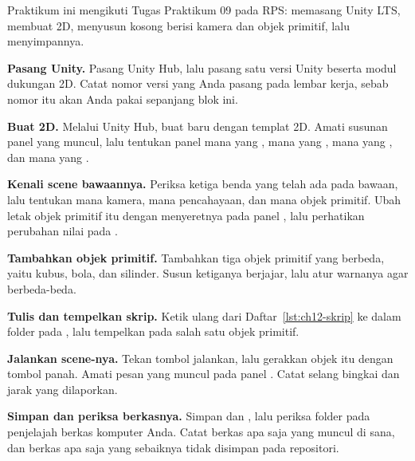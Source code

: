 \begin{praktikumbox}
Praktikum ini mengikuti Tugas Praktikum 09 pada RPS: memasang Unity LTS,
membuat  2D, menyusun  kosong berisi kamera dan
objek primitif, lalu menyimpannya.

\begin{langkah}
  \item \textbf{Pasang Unity.} Pasang Unity Hub, lalu pasang satu versi Unity
         beserta modul dukungan 2D. Catat nomor versi yang Anda
        pasang pada lembar kerja, sebab nomor itu akan Anda pakai sepanjang
        blok ini.

  \item \textbf{Buat  2D.} Melalui Unity Hub, buat
         baru dengan templat 2D. Amati susunan panel yang
        muncul, lalu tentukan panel mana yang , mana yang
        , mana yang , dan mana yang
        .

  \item \textbf{Kenali scene bawaannya.} Periksa ketiga benda yang telah ada
        pada  bawaan, lalu tentukan mana kamera, mana
        pencahayaan, dan mana objek primitif. Ubah letak objek primitif itu
        dengan menyeretnya pada panel , lalu perhatikan perubahan
        nilai pada .

  \item \textbf{Tambahkan objek primitif.} Tambahkan tiga objek primitif yang
        berbeda, yaitu kubus, bola, dan silinder. Susun ketiganya berjajar, lalu
        atur warnanya agar berbeda-beda.

  \item \textbf{Tulis dan tempelkan skrip.} Ketik ulang
         dari Daftar~\ref{lst:ch12-skrip} ke dalam
        folder  pada , lalu tempelkan pada
        salah satu objek primitif.

  \item \textbf{Jalankan scene-nya.} Tekan tombol jalankan, lalu gerakkan objek
        itu dengan tombol panah. Amati pesan yang muncul pada panel
        . Catat selang bingkai dan jarak yang dilaporkan.

  \item \textbf{Simpan dan periksa berkasnya.} Simpan  dan
        , lalu periksa folder  pada penjelajah
        berkas komputer Anda. Catat berkas apa saja yang muncul di sana, dan
        berkas apa saja yang sebaiknya tidak disimpan pada repositori.


\end{langkah}
\end{praktikumbox}
